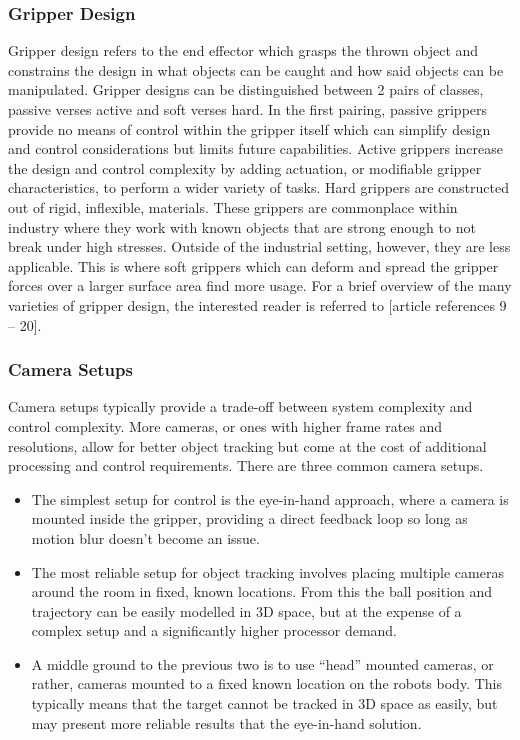 \documentclass[conference]{IEEEtran}
\begin{document}
	\subsubsection{Gripper Design}
	Gripper design refers to the end effector which grasps the thrown object and constrains the design in what objects can be caught and how said objects can be manipulated. Gripper designs can be distinguished between 2 pairs of classes, passive verses active and soft verses hard.
	In the first pairing, passive grippers provide no means of control within the gripper itself which can simplify design and control considerations but limits future capabilities. Active grippers increase the design and control complexity by adding actuation, or modifiable gripper characteristics, to perform a wider variety of tasks.
	Hard grippers are constructed out of rigid, inflexible, materials. These grippers are commonplace within industry where they work with known objects that are strong enough to not break under high stresses. Outside of the industrial setting, however, they are less applicable. This is where soft grippers which can deform and spread the gripper forces over a larger surface area find more usage.
	For a brief overview of the many varieties of gripper design, the interested reader is referred to [article references 9 – 20].
	
	\subsubsection{Camera Setups}
	Camera setups typically provide a trade-off between system complexity and control complexity. More cameras, or ones with higher frame rates and resolutions, allow for better object tracking but come at the cost of additional processing and control requirements.
	There are three common camera setups.
	\begin{itemize}
		\item The simplest setup for control is the eye-in-hand approach, where a camera is mounted inside the gripper, providing a direct feedback loop so long as motion blur doesn’t become an issue.
		\item The most reliable setup for object tracking involves placing multiple cameras around the room in fixed, known locations. From this the ball position and trajectory can be easily modelled in 3D space, but at the expense of a complex setup and a significantly higher processor demand.
		\item A middle ground to the previous two is to use “head” mounted cameras, or rather, cameras mounted to a fixed known location on the robots body. This typically means that the target cannot be tracked in 3D space as easily, but may present more reliable results that the eye-in-hand solution. 
	\end{itemize}
\end{document}
